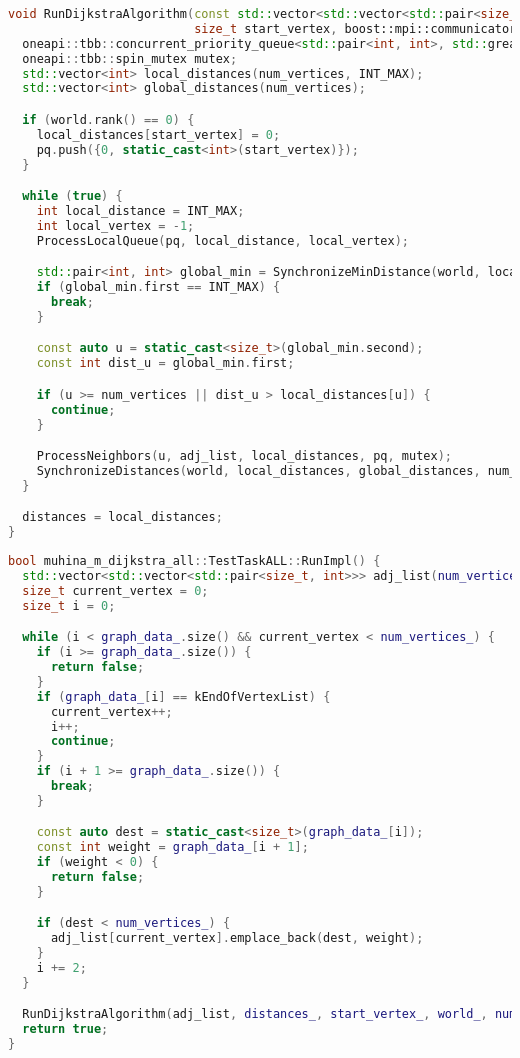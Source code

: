 \documentclass[12pt]{article}
\begin{document}
\begin{lstlisting}[language=C++]
void RunDijkstraAlgorithm(const std::vector<std::vector<std::pair<size_t, int>>>& adj_list, std::vector<int>& distances,
                          size_t start_vertex, boost::mpi::communicator& world, size_t num_vertices) {
  oneapi::tbb::concurrent_priority_queue<std::pair<int, int>, std::greater<>> pq;
  oneapi::tbb::spin_mutex mutex;
  std::vector<int> local_distances(num_vertices, INT_MAX);
  std::vector<int> global_distances(num_vertices);

  if (world.rank() == 0) {
    local_distances[start_vertex] = 0;
    pq.push({0, static_cast<int>(start_vertex)});
  }

  while (true) {
    int local_distance = INT_MAX;
    int local_vertex = -1;
    ProcessLocalQueue(pq, local_distance, local_vertex);

    std::pair<int, int> global_min = SynchronizeMinDistance(world, local_distance, local_vertex);
    if (global_min.first == INT_MAX) {
      break;
    }

    const auto u = static_cast<size_t>(global_min.second);
    const int dist_u = global_min.first;

    if (u >= num_vertices || dist_u > local_distances[u]) {
      continue;
    }

    ProcessNeighbors(u, adj_list, local_distances, pq, mutex);
    SynchronizeDistances(world, local_distances, global_distances, num_vertices);
  }

  distances = local_distances;
}
\end{lstlisting}
\begin{lstlisting}[language=C++]
bool muhina_m_dijkstra_all::TestTaskALL::RunImpl() {
  std::vector<std::vector<std::pair<size_t, int>>> adj_list(num_vertices_);
  size_t current_vertex = 0;
  size_t i = 0;

  while (i < graph_data_.size() && current_vertex < num_vertices_) {
    if (i >= graph_data_.size()) {
      return false;
    }
    if (graph_data_[i] == kEndOfVertexList) {
      current_vertex++;
      i++;
      continue;
    }
    if (i + 1 >= graph_data_.size()) {
      break;
    }

    const auto dest = static_cast<size_t>(graph_data_[i]);
    const int weight = graph_data_[i + 1];
    if (weight < 0) {
      return false;
    }

    if (dest < num_vertices_) {
      adj_list[current_vertex].emplace_back(dest, weight);
    }
    i += 2;
  }

  RunDijkstraAlgorithm(adj_list, distances_, start_vertex_, world_, num_vertices_);
  return true;
}
\end{lstlisting}
\end{document}
